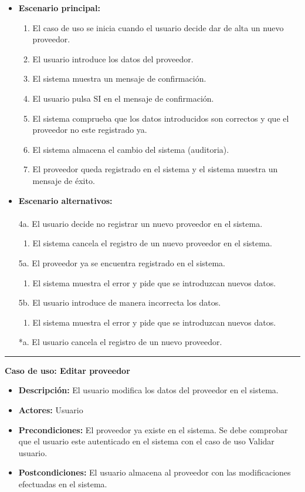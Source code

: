 \begin{itemize}\renewcommand{\labelitemi}{$\circ$}
 \item \textbf{Escenario principal:}
         \begin{enumerate}
          \item El caso de uso se inicia cuando el usuario decide dar de alta un nuevo proveedor.
          \item El usuario introduce los datos del proveedor.
          \item El sistema muestra un mensaje de confirmación.
          \item El usuario pulsa SI en el mensaje de confirmación.
          \item El sistema comprueba que los datos introducidos son correctos y que el proveedor no este registrado ya.
 	  \item El sistema almacena el cambio del sistema (auditoria).
          \item El proveedor queda registrado en el sistema y el sistema muestra un mensaje de éxito.
         \end{enumerate}
  \item \textbf{Escenario alternativos:}\\\\
	4a. El usuario decide no registrar un nuevo proveedor en el sistema.
	      \begin{enumerate}
	       \item El sistema cancela el registro de un nuevo proveedor en el sistema.
	      \end{enumerate}
         5a. El proveedor ya se encuentra registrado en el sistema.
	      \begin{enumerate}
	       \item El sistema muestra el error y pide que se introduzcan nuevos datos.
	      \end{enumerate}
           5b. El usuario introduce de manera incorrecta los datos.
		\begin{enumerate}
		 \item El sistema muestra el error y pide que se introduzcan nuevos datos.
		\end{enumerate}
          *a. El usuario cancela el registro de un nuevo proveedor.
\end{itemize}
\smallskip
\hrule height 1pt
\smallskip
\textbf{Caso de uso: Editar proveedor}
\begin{itemize}\renewcommand{\labelitemi}{$\cdot$}
 \item \textbf{Descripción:} El usuario modifica los datos del proveedor en el sistema.
  \item \textbf{Actores:} Usuario
  \item \textbf{Precondiciones:} El proveedor ya existe en el sistema. Se debe comprobar que el usuario este autenticado en el sistema con el caso de uso Validar usuario.
  \item \textbf{Postcondiciones:} El usuario almacena al proveedor con las modificaciones efectuadas en el sistema.
\end{itemize}
